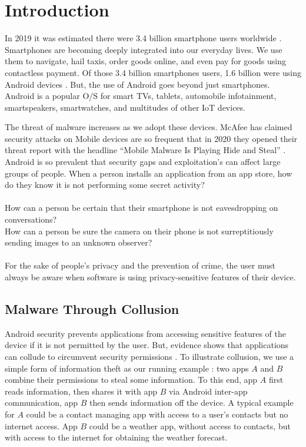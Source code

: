 \chapter{Introduction}

In 2019 it was estimated there were 3.4 billion smartphone users worldwide \cite{SmartphoneUsers2019}.  Smartphones are becoming deeply integrated into our everyday lives.  We use them to navigate, hail taxis, order goods online, and even pay for goods using contactless payment.  Of those 3.4 billion smartphones users, 1.6 billion were using Android devices \cite{AndroidUsers2019}.  But, the use of Android goes beyond just smartphones.  Android is a popular O/S for smart TVs, tablets, automobile infotainment, smartspeakers, smartwatches, and multitudes of other IoT devices.

The threat of malware increases as we adopt these devices.  McAfee has claimed security attacks on Mobile devices are so frequent that in 2020 they opened their threat report with the headline ``Mobile Malware Is Playing Hide and Steal'' \cite{McAfeeMobileThreatReport}.  Android is so prevalent that security gaps and exploitation's can affect large groups of people.  When a person installs an application from an app store, how do they know it is not performing some secret activity?\\
\\
\noindent How can a person be certain that their smartphone is not eavesdropping on conversations?\\
\noindent How can a person be sure the camera on their phone is not surreptitiously sending images to an unknown observer?\\
\\
For the sake of people's privacy and the prevention of crime, the user must always be aware when software is using privacy-sensitive features of their device.

\section{Malware Through Collusion}

Android security prevents applications from accessing sensitive features of the device if it is not permitted by the user.  But, evidence shows that applications can collude to circumvent security permissions \cite{PrologAppCollusion}.  To illustrate collusion, we use a simple form of information theft as our running example \cite{DetectingMaliciousCollusion}: two apps $A$ and $B$ combine their permissions to steal some information.  To this end, app $A$ first reads information, then shares it with app $B$ via Android inter-app communication, app $B$ then sends information off the device.  A typical example for $A$ could be a contact managing app with access to a user's contacts but no internet access.  App $B$ could be a weather app, without access to contacts, but with access to the
internet for obtaining the weather forecast.

